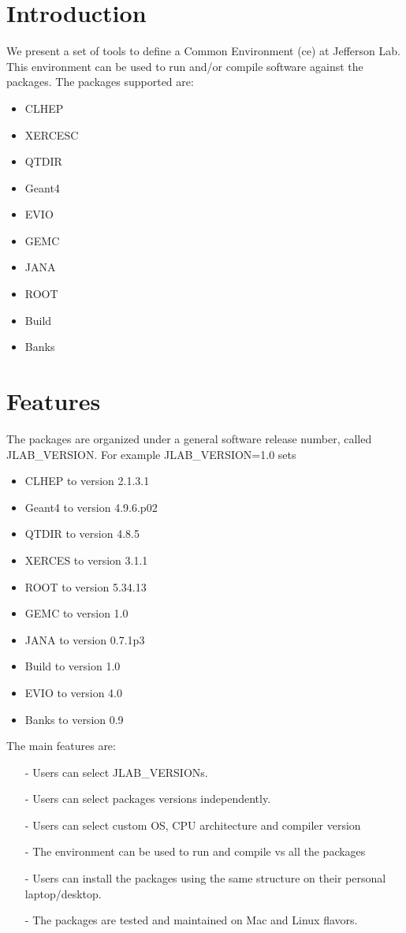 \section{Introduction}
We present a set of tools to define a Common Environment (ce) at Jefferson Lab.
This environment can be used to run and/or compile software against the packages.
The packages supported are:

\begin{itemize}
 \item CLHEP   
 \item XERCESC  
 \item QTDIR   
 \item Geant4  
 \item EVIO    
 \item GEMC    
 \item JANA    
 \item ROOT   
 \item Build   
 \item Banks   
\end{itemize}

\clearpage\newpage
\section{Features}
The packages are organized under a general software release 
number, called JLAB\_VERSION. 
For example JLAB\_VERSION=1.0 sets

\begin{itemize}
 \item CLHEP   to version 2.1.3.1
 \item Geant4  to version 4.9.6.p02
 \item QTDIR   to version 4.8.5
 \item XERCES  to version 3.1.1
 \item ROOT    to version 5.34.13
 \item GEMC    to version 1.0
 \item JANA    to version 0.7.1p3
 \item Build   to version 1.0
 \item EVIO    to version 4.0
 \item Banks   to version 0.9
\end{itemize}
The main features are:

\begin{itemize}
 \item[-] Users can select JLAB\_VERSIONs.
 \item[-] Users can select packages versions independently.
 \item[-] Users can select custom OS, CPU architecture and compiler version
 \item[-] The environment can be used to run and compile vs all the packages
 \item[-] Users can install the packages using the same structure on their 
 personal laptop/desktop.
 \item[-] The packages are tested and maintained on Mac and Linux flavors.
\end{itemize}

